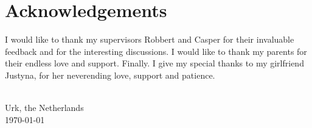 
\chapter{\label{chap:Preface}Acknowledgements}
I would like to thank my supervisors Robbert and Casper for their invaluable feedback and for the interesting discussions.
I would like to thank my parents for their endless love and support.
Finally. I give my special thanks to my girlfriend Justyna, for her neverending love, support and patience.

\vspace{1cm}
\begin{flushright}
\theauthor{}\\
Urk, the Netherlands\\
\today{}\\
\end{flushright}
